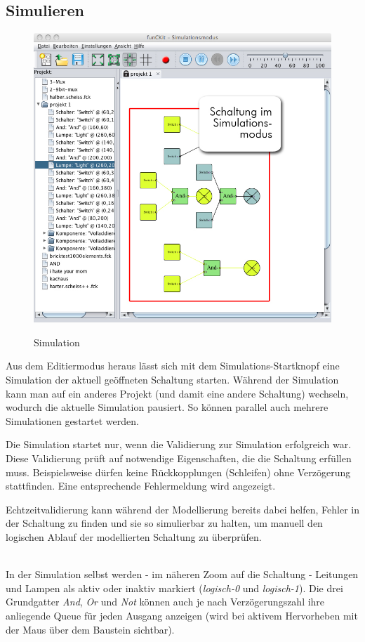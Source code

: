 \documentclass[12pt,a4paper]{scrartcl}
\begin{document}
\subsection{Simulieren}
		\begin{figure}[H]
			\centering
			\includegraphics[width=\linewidth]{images/simulationsmodus.jpg}
			\label{fig:circuit-simulationmode}
			\caption{Simulation}
		\end{figure}
Aus dem Editiermodus heraus lässt sich mit dem Simulations-Startknopf eine Simulation der aktuell geöffneten Schaltung starten. Während der Simulation kann man auf ein anderes Projekt (und damit eine andere Schaltung) wechseln, wodurch die aktuelle Simulation pausiert. So können parallel auch mehrere Simulationen gestartet werden.

Die Simulation startet nur, wenn die Validierung zur Simulation erfolgreich war. Diese Validierung prüft auf notwendige Eigenschaften, die die Schaltung erfüllen muss. Beispielsweise dürfen keine Rückkopplungen (Schleifen) ohne Verzögerung stattfinden. Eine entsprechende Fehlermeldung wird angezeigt.
\begin{info}
	Echtzeitvalidierung kann während der Modellierung bereits dabei helfen, Fehler in der Schaltung zu finden und sie so simulierbar zu halten, um manuell den logischen Ablauf der modellierten Schaltung zu überprüfen.
\end{info} \\
In der Simulation selbst werden - im näheren Zoom auf die Schaltung - Leitungen und Lampen als aktiv oder inaktiv markiert (\textit{logisch-0} und \textit{logisch-1}). Die drei Grundgatter \textit{And}, \textit{Or} und \textit{Not} können auch je nach Verzögerungszahl ihre anliegende Queue für jeden Ausgang anzeigen (wird bei aktivem Hervorheben mit der Maus über dem Baustein sichtbar).
\end{document}
